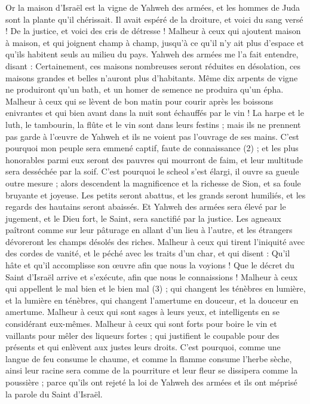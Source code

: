 \begin{multicols}{2}
Or la maison d'Israël est la vigne de Yahweh des armées, et les hommes de Juda sont la plante qu’il chérissait. Il avait espéré de la droiture, et voici du sang versé ! De la justice, et voici des cris de détresse !
Malheur à ceux qui ajoutent maison à maison, et qui joignent champ à champ, jusqu’à ce qu'il n'y ait plus d'espace et qu’ils habitent seuls au milieu du pays.
Yahweh des armées me l’a fait entendre, disant : Certainement, ces maisons nombreuses seront réduites en désolation, ces maisons grandes et belles n’auront plus d’habitants.
Même dix arpents de vigne ne produiront qu'un bath, et un homer de semence ne produira qu'un épha.
Malheur à ceux qui se lèvent de bon matin pour courir après les boissons enivrantes et qui bien avant dans la nuit sont échauffés par le vin !
La harpe et le luth, le tambourin, la flûte et le vin sont dans leurs festins ; mais ils ne prennent pas garde à l’œuvre de Yahweh et ils ne voient pas l'ouvrage de ses mains.
C’est pourquoi mon peuple sera emmené captif, faute de connaissance (2) ; et les plus honorables parmi eux seront des pauvres qui mourront de faim, et leur multitude sera desséchée par la soif.
C'est pourquoi le scheol s'est élargi, il ouvre sa gueule outre mesure ; alors descendent la magnificence et la richesse de Sion, et sa foule bruyante et joyeuse.
Les petits seront abattus, et les grands seront humiliés, et les regards des hautains seront abaissés.
Et Yahweh des armées sera élevé par le jugement, et le Dieu fort, le Saint, sera sanctifié par la justice.
Les agneaux paîtront comme sur leur pâturage en allant d'un lieu à l'autre, et les étrangers dévoreront les champs désolés des riches.
Malheur à ceux qui tirent l'iniquité avec des cordes de vanité, et le péché avec les traits d’un char,
et qui disent : Qu’il hâte et qu'il accomplisse son œuvre afin que nous la voyions ! Que le décret du Saint d'Israël arrive et s’exécute, afin que nous le connaissions !
Malheur à ceux qui appellent le mal bien et le bien mal (3) ; qui changent les ténèbres en lumière, et la lumière en ténèbres, qui changent l'amertume en douceur, et la douceur en amertume.
Malheur à ceux qui sont sages à leurs yeux, et intelligents en se considérant eux-mêmes.
Malheur à ceux qui sont forts pour boire le vin et vaillants pour mêler des liqueurs fortes ;
qui justifient le coupable pour des présents et qui enlèvent aux justes leurs droits.
C'est pourquoi, comme une langue de feu consume le chaume, et comme la flamme consume l’herbe sèche, ainsi leur racine sera comme de la pourriture et leur fleur se dissipera comme la poussière ; parce qu'ils ont rejeté la loi de Yahweh des armées et ils ont méprisé la parole du Saint d'Israël.

\end{multicols}
